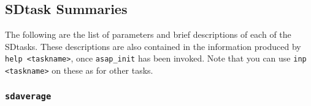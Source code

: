 \subsection{SDtask Summaries}
\label{section:sd.sdtasks.tasks}

The following are the list of parameters and
brief descriptions of each of the SDtasks.
These descriptions are also contained in the information produced
by {\tt help <taskname>}, once {\tt asap\_init} has been invoked.
Note that you can use {\tt inp <taskname>} on these as for other tasks.

\subsubsection{{\tt sdaverage}}
\label{section:sd.sdtasks.tasks.sdaverage}

